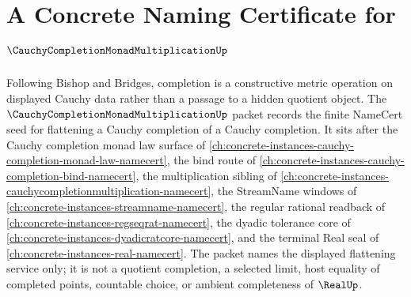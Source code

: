 \chapter{A Concrete Naming Certificate for $\CauchyCompletionMonadMultiplicationUp$}
\label{ch:concrete-instances-cauchy-completion-monad-multiplication-namecert}

Following Bishop and Bridges, completion is a constructive metric operation on displayed Cauchy data rather than a passage to a hidden quotient object. The $\CauchyCompletionMonadMultiplicationUp$ packet records the finite NameCert seed for flattening a Cauchy completion of a Cauchy completion. It sits after the Cauchy completion monad law surface of \autoref{ch:concrete-instances-cauchy-completion-monad-law-namecert}, the bind route of \autoref{ch:concrete-instances-cauchy-completion-bind-namecert}, the multiplication sibling of \autoref{ch:concrete-instances-cauchycompletionmultiplication-namecert}, the StreamName windows of \autoref{ch:concrete-instances-streamname-namecert}, the regular rational readback of \autoref{ch:concrete-instances-regseqrat-namecert}, the dyadic tolerance core of \autoref{ch:concrete-instances-dyadicratcore-namecert}, and the terminal Real seal of \autoref{ch:concrete-instances-real-namecert}. The packet names the displayed flattening service only; it is not a quotient completion, a selected limit, host equality of completed points, countable choice, or ambient completeness of $\RealUp$.

